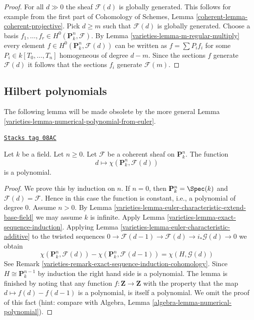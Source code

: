 \begin{proof}

For all $d \gg 0$ the sheaf $\mathcal{F}(d)$ is globally generated.
This follows for example from the first part of
Cohomology of Schemes, Lemma \ref{coherent-lemma-coherent-projective}.
Pick $d \geq m$ such that $\mathcal{F}(d)$ is globally generated.
Choose a basis $f_1, \ldots, f_r \in H^0(\mathbf{P}^n_k, \mathcal{F})$.
By Lemma \ref{varieties-lemma-m-regular-multiply} every element
$f \in H^0(\mathbf{P}^n_k, \mathcal{F}(d))$ can be written as
$f = \sum P_if_i$ for some $P_i \in k[T_0, \ldots, T_n]$ homogeneous
of degree $d - m$. Since the sections $f$ generate $\mathcal{F}(d)$
it follows that the sections $f_i$ generate $\mathcal{F}(m)$.
\end{proof}

\subsection{Hilbert polynomials}
\label{varieties-subsection-hilbert}

The following lemma will be made obsolete by the more general
Lemma \ref{varieties-lemma-numerical-polynomial-from-euler}.

\begin{lemma}
\label{varieties-lemma-hilbert-polynomial}
\href{https://stacks.math.columbia.edu/tag/08AC}{\texttt{Stacks tag 08AC}}

Let $k$ be a field. Let $n \geq 0$. Let $\mathcal{F}$ be a coherent sheaf
on $\mathbf{P}^n_k$. The function
$$
d \longmapsto \chi(\mathbf{P}^n_k, \mathcal{F}(d))
$$
is a polynomial.
\end{lemma}

\begin{proof}

We prove this by induction on $n$. If $n = 0$, then
$\mathbf{P}^n_k = \Spec(k)$ and $\mathcal{F}(d) = \mathcal{F}$.
Hence in this case the function is constant, i.e., a polynomial
of degree $0$. Assume $n > 0$. By
Lemma \ref{varieties-lemma-euler-characteristic-extend-base-field}
we may assume $k$ is infinite. Apply
Lemma \ref{varieties-lemma-exact-sequence-induction}.
Applying Lemma \ref{varieties-lemma-euler-characteristic-additive}
to the twisted sequences
$0 \to \mathcal{F}(d - 1) \to \mathcal{F}(d) \to i_*\mathcal{G}(d) \to 0$
we obtain
$$
\chi(\mathbf{P}^n_k, \mathcal{F}(d)) -
\chi(\mathbf{P}^n_k, \mathcal{F}(d - 1)) =
\chi(H, \mathcal{G}(d))
$$
See Remark \ref{varieties-remark-exact-sequence-induction-cohomology}.
Since $H \cong \mathbf{P}^{n - 1}_k$
by induction the right hand side is a polynomial.
The lemma is finished by noting that any function
$f : \mathbf{Z} \to \mathbf{Z}$ with the property that the map
$d \mapsto f(d) - f(d - 1)$ is a polynomial, is itself a polynomial.
We omit the proof of this fact (hint: compare with
Algebra, Lemma \ref{algebra-lemma-numerical-polynomial}).
\end{proof}

